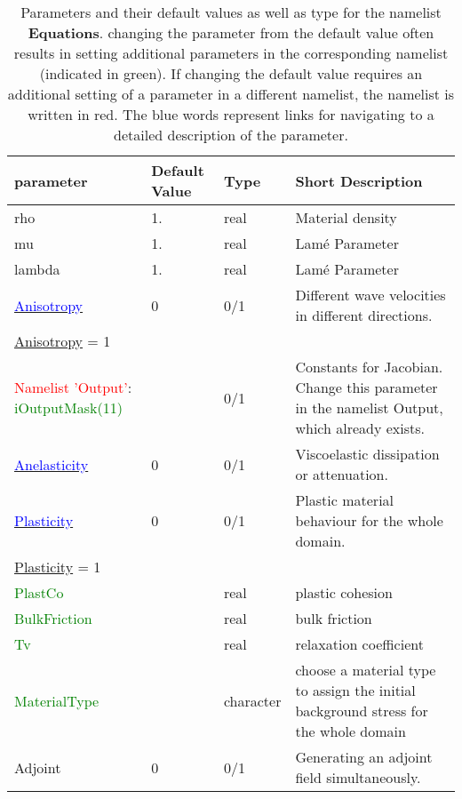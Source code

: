 \documentclass[12pt,twoside]{article}
\begin{document}
\begin{longtable}{|p{3cm}|p{2.4cm}|p{2cm}|p{5cm}|}%
\caption{Parameters and their default values as well as type for the namelist \textbf{Equations}.
         changing the parameter from the default value often results in setting additional parameters in the corresponding namelist 
         (indicated in green). 
         If changing the default value requires an additional setting of a parameter in a different namelist, 
         the namelist is written in red. The blue words represent 
         links for navigating to a detailed description of the parameter.} \\
\hline
parameter & Default Value & Type & Short Description \\
\hline
\hline
rho   & 1. & real &  Material density \\
mu    & 1. & real & Lam\' e Parameter \\
lambda   & 1. & real & Lam\' e Parameter \\
\hline
\hyperlink{aniso}{\textcolor{blue}{Anisotropy}} & 0 & 0/1  & Different wave velocities in different directions.\\
\hdashline
\uline{Anisotropy} = 1 & & &\\
\textcolor{red}{Namelist 'Output'}: \textcolor{green}{iOutputMask(11)} & & 0/1 & Constants for Jacobian. Change this parameter in the namelist Output, which already exists.\\
\hline
\hyperlink{anelas}{\textcolor{blue}{Anelasticity}} & 0 & 0/1 & Viscoelastic dissipation or attenuation.\\
\hline
\hyperlink{plast}{\textcolor{blue}{Plasticity}} & 0 & 0/1 & Plastic material behaviour for the whole domain.\\
\hdashline
\uline{Plasticity} = 1 & & &\\
\textcolor{green} {PlastCo} & & real & plastic cohesion \\
\textcolor{green} {BulkFriction} & & real & bulk friction \\
\textcolor{green} {Tv} & & real & relaxation coefficient \\
\textcolor{green}{MaterialType} & & character & choose a material type to assign the initial background stress for the whole domain \\
\hline
Adjoint & 0 & 0/1  & Generating an adjoint field simultaneously.\\

\end{longtable}
\end{document}
